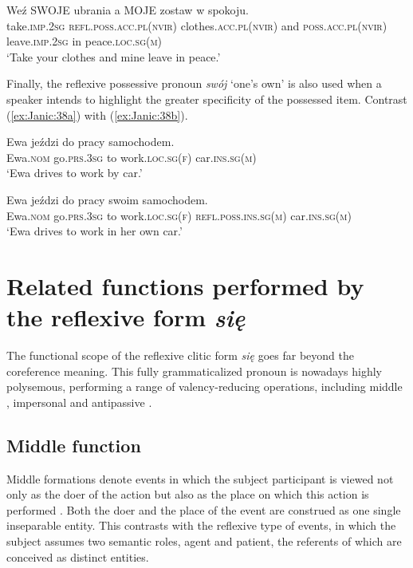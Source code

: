\documentclass[output=paper]{langscibook}
\begin{document}
\ex\label{ex:Janic:37b}
\gll Weź 	 \textsc{SWOJE}	 ubrania	 a	\textsc{MOJE} zostaw w	spokoju.\\
		take.\textsc{imp.2sg}	\textsc{refl.poss.acc.pl(nvir)}	 clothes.\textsc{acc.pl(nvir)}	and	\textsc{poss.acc.pl(nvir)} leave.\textsc{imp.2sg} in	peace.\textsc{loc.sg(m)}\\
\glt ‘Take your clothes and mine leave in peace.’			
\z 
\z 

Finally, the reflexive possessive pronoun \textit{swój} ‘one’s own’ is also used when a speaker intends to highlight the greater specificity of the possessed item. Contrast (\ref{ex:Janic:38a}) with (\ref{ex:Janic:38b}). 

\ea \label{ex:Janic:38}
\ea \label{ex:Janic:38a}
\gll Ewa	 jeździ			 do	pracy		 samochodem.\\
		Ewa.\textsc{nom}	go.\textsc{prs.3sg}	 to	work.\textsc{loc.sg(f)}	car.\textsc{ins.sg(m)}\\
\glt ‘Ewa drives to work by car.’

\ex \label{ex:Janic:38b}
\gll Ewa		 jeździ	 do	pracy	 swoim			 samochodem.\\
		Ewa.\textsc{nom} go.\textsc{prs.3sg}	to	work.\textsc{loc.sg(f)}	\textsc{refl.poss.ins.sg(m)}	car.\textsc{ins.sg(m)}\\
\glt ‘Ewa drives to work in her own car.’ \citep[180]{Sadowska2012}

\z 
\z 

\section{Related functions performed by the reflexive form \textit{się}}
\label{sec:Janic:4}

The functional scope of the reflexive clitic form \textit{się} goes far beyond the coreference meaning. This fully grammaticalized pronoun is nowadays highly polysemous, performing a range of valency-reducing operations, including middle , impersonal  and antipassive . 


\subsection{Middle function} \label{sec:Janic:4.1}

Middle formations denote events in which the subject participant is viewed not only as the doer of the action but also as the place on which this action is performed \citep{Benveniste1966, Kemmer1993, Creissels2006}. Both the doer and the place of the event are construed as one single inseparable entity. This contrasts with the reflexive type of events, in which the subject assumes two semantic roles, agent and patient, the referents of which are conceived as distinct entities. 
\end{document}
